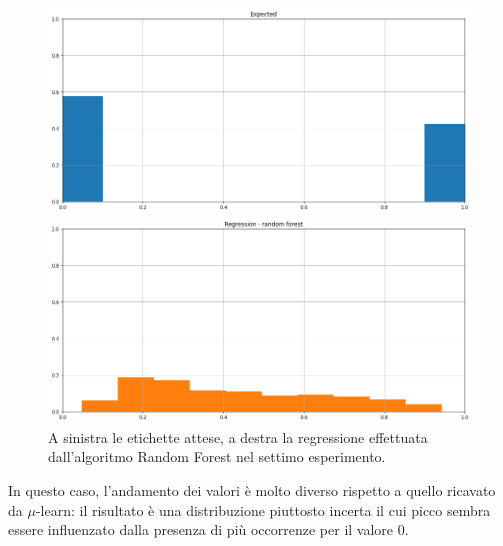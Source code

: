\documentclass[12pt]{report}
\theoremstyle{definition}
\begin{document}
\begin{figure}
\centering
    \begin{minipage}{0.48\textwidth}
        \includegraphics[width=\linewidth]{images/experiment kaggle/expected_classification.png}
    \end{minipage}
    \begin{minipage}{0.48\textwidth}
        \includegraphics[width=\linewidth]{images/experiment kaggle/prediction_regression_rf.png}
    \end{minipage}
    \caption{A sinistra le etichette attese, a destra la regressione effettuata dall'algoritmo Random Forest nel settimo esperimento.}
    \label{rf_exp7}
\end{figure} 
In questo caso, l'andamento dei valori è molto diverso rispetto a quello ricavato da $\mu$-learn: il risultato è una distribuzione piuttosto incerta il cui picco sembra essere influenzato dalla presenza di più occorrenze per il valore 0.
\end{document}
